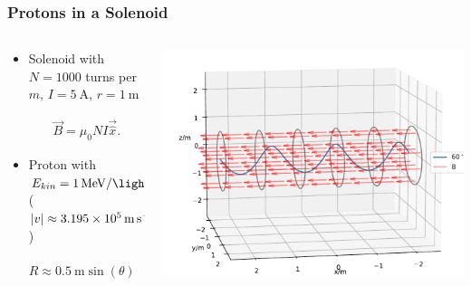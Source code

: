 \documentclass{beamer}
\begin{document}
\begin{frame}
\frametitle{Protons in a Solenoid}
\begin{columns}
\begin{column}{0.5\linewidth}
\begin{itemize}

\item<1-> Solenoid with $N=1000$ turns per $m$, $I=\SI{5}{\ampere}$, $r=\SI{1}{\meter}$

\begin{align*}
\vec{B}=\mu_0 N I \vec{\hat{x}}.
\end{align*}

\item<2-> Proton with $E_{kin}=\SI{1}{\mega\electronvolt\per\square\lightspeed}$ ($|v|\approx \SI{3.195E5}{\meter\per\second}$)


\begin{equation*}
R \approx \SI{0.5}{\meter}\sin(\theta) \quad T=\frac{2\pi}{\omega} \approx \SI{1.7}{\micro\second}
\end{equation*}

\end{itemize}
\end{column}
\begin{column}{0.5\linewidth}
\includegraphics[width=\linewidth]{helix.pdf}
\end{column}
\end{columns}
\end{frame}
\end{document}
